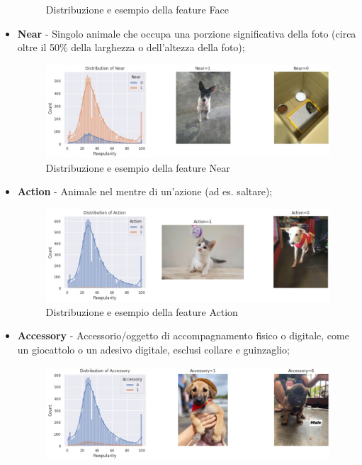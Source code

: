 \begin{itemize}
\begin{figure}[H]
            \caption{Distribuzione e esempio della feature Face}
            \label{fig:face}
        \end{figure}
        \item \textbf{Near} - Singolo animale che occupa una porzione significativa della foto (circa oltre il 50\% della larghezza o dell'altezza della foto);
        \begin{figure}[H]
            \centering
            \includegraphics[scale=0.5]{Plot/distribution_near.jpg}
            \caption{Distribuzione e esempio della feature Near}
            \label{fig:near}
        \end{figure}
        \item \textbf{Action} - Animale nel mentre di un'azione (ad es. saltare);
        \begin{figure}[H]
            \centering
            \includegraphics[scale=0.5]{Plot/distribution_action.jpg}
            \caption{Distribuzione e esempio della feature Action}
            \label{fig:action}
        \end{figure}
        \item \textbf{Accessory} - Accessorio/oggetto di accompagnamento fisico o digitale, come un giocattolo o un adesivo digitale, esclusi collare e guinzaglio;
        \begin{figure}[H]
            \centering
            \includegraphics[scale=0.5]{Plot/distribution_accessory.jpg}

\end{figure}
\end{itemize}
